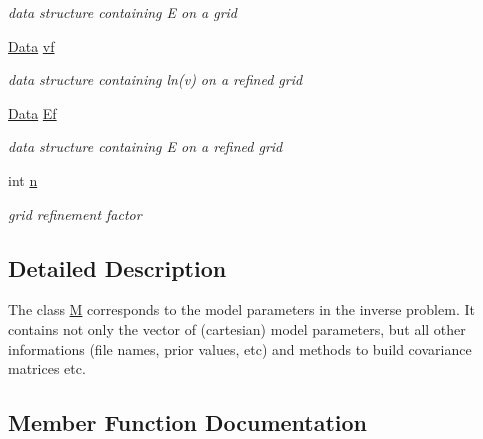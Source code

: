 \begin{DoxyCompactItemize}
\begin{DoxyCompactList}\small\item\em data structure containing E on a grid \end{DoxyCompactList}\item 
\hypertarget{class_m_a61aa549798080380365aa3d0e360e3d8}{}\hyperlink{class_data}{Data} \hyperlink{class_m_a61aa549798080380365aa3d0e360e3d8}{vf}\label{class_m_a61aa549798080380365aa3d0e360e3d8}

\begin{DoxyCompactList}\small\item\em data structure containing ln(v) on a refined grid \end{DoxyCompactList}\item 
\hypertarget{class_m_a7e2544d0f3635e91cc3c1af82a009fdc}{}\hyperlink{class_data}{Data} \hyperlink{class_m_a7e2544d0f3635e91cc3c1af82a009fdc}{Ef}\label{class_m_a7e2544d0f3635e91cc3c1af82a009fdc}

\begin{DoxyCompactList}\small\item\em data structure containing E on a refined grid \end{DoxyCompactList}\item 
\hypertarget{class_m_a9253f8fa827548abf4e542e80b315aa1}{}int \hyperlink{class_m_a9253f8fa827548abf4e542e80b315aa1}{n}\label{class_m_a9253f8fa827548abf4e542e80b315aa1}

\begin{DoxyCompactList}\small\item\em grid refinement factor \end{DoxyCompactList}\end{DoxyCompactItemize}


\subsection{Detailed Description}
The class \hyperlink{class_m}{M} corresponds to the model parameters in the inverse problem. It contains not only the vector of (cartesian) model parameters, but all other informations (file names, prior values, etc) and methods to build covariance matrices etc. 

\subsection{Member Function Documentation}
\hypertarget{class_m_a8d9192b1fabcfdb0a4e860ff41e23827}{}
